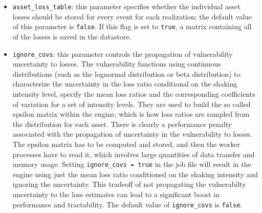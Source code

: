 \begin{itemize}
  \item \Verb+asset_loss_table+: this parameter
    specifies whether the individual asset losses should be stored for every 
    event for each realization; the default value of this parameter is
    \Verb+false+. If this flag is set to \Verb+true+, a
    matrix containing all of the losses is saved in the datastore.

  \item \Verb+ignore_covs+: this parameter controls the propagation of 
    vulnerability uncertainty to losses. The vulnerability functions using 
    continuous distributions (such as the lognormal distribution or beta 
    distribution) to characterize the uncertainty in the loss ratio 
    conditional on the shaking intensity level, specify the mean loss ratios 
    and the corresponding coefficients of variation for a set of intensity 
    levels. They are used to build the so called epsilon matrix within the 
    engine, which is how loss ratios are sampled from the distribution for 
    each asset. There is clearly a performance penalty associated with the 
    propagation of uncertainty in the vulnerability to losses. The epsilon 
    matrix has to be computed and stored, and then the worker processes have 
    to read it, which involves large quantities of data transfer and memory 
    usage. Setting \Verb+ignore_covs = true+ in the job file will result in 
    the engine using just the mean loss ratio conditioned on the shaking 
    intensity and ignoring the uncertainty. This tradeoff of not propagating 
    the vulnerabilty uncertainty to the loss estimates can lead to a 
    significant boost in performance and tractability. The default value of 
    \Verb+ignore_covs+ is \Verb+false+. 

\end{itemize}
